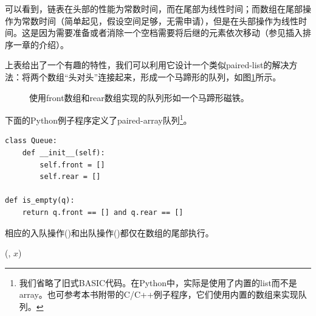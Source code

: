 \documentclass[UTF8]{article}
\begin{document}
可以看到，链表在头部的性能为常数时间，而在尾部为线性时间；而数组在尾部操作为常数时间（简单起见，假设空间足够，无需申请），但是在头部操作为线性时间。这是因为需要准备或者消除一个空档需要将后继的元素依次移动（参见插入排序一章的介绍）。

上表给出了一个有趣的特性，我们可以利用它设计一个类似paired-list的解决方法：将两个数组“头对头”连接起来，形成一个马蹄形的队列，如图\ref{fig:horseshoe-array}所示。

\begin{figure}[htbp]
  \centering
  \caption{使用front数组和rear数组实现的队列形如一个马蹄形磁铁。} \label{fig:horseshoe-array}
\end{figure}

下面的Python例子程序定义了paired-array队列\footnote{我们省略了旧式BASIC代码。在Python中，实际是使用了内置的list而不是array。也可参考本书附带的C/C++例子程序，它们使用内置的数组来实现队列。}。

\lstset{language=Python}
\begin{lstlisting}
class Queue:
    def __init__(self):
        self.front = []
        self.rear = []

def is_empty(q):
    return q.front == [] and q.rear == []
\end{lstlisting}

相应的入队操作()和出队操作()都仅在数组的尾部执行。

\begin{algorithmic}
  \State {}(, $x$)
\EndFunction
\end{algorithmic}
\end{document}
